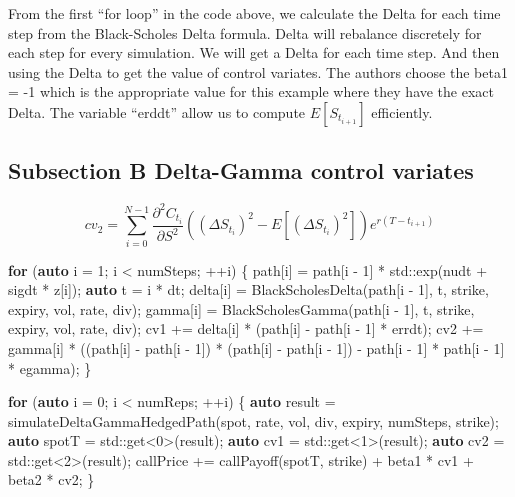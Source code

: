\documentclass[11pt,]{article}
\newenvironment{Shaded}{\begin{snugshade}}{\end{snugshade}}
\newcommand{\KeywordTok}[1]{\textcolor[rgb]{0.13,0.29,0.53}{\textbf{#1}}}
\newcommand{\DecValTok}[1]{\textcolor[rgb]{0.00,0.00,0.81}{#1}}
\newcommand{\ControlFlowTok}[1]{\textcolor[rgb]{0.13,0.29,0.53}{\textbf{#1}}}
\newcommand{\BuiltInTok}[1]{#1}
\newcommand{\NormalTok}[1]{#1}
\begin{document}
From the first ``for loop'' in the code above, we calculate the Delta
for each time step from the Black-Scholes Delta formula. Delta will
rebalance discretely for each step for every simulation. We will get a
Delta for each time step. And then using the Delta to get the value of
control variates. The authors choose the beta1 = -1 which is the
appropriate value for this example where they have the exact Delta. The
variable ``erddt'' allow us to compute \(E[S_{t_{i+1}}]\) efficiently.

\subsection{Subsection B Delta-Gamma control
variates}\label{subsection-b-delta-gamma-control-variates}

\[
cv_2 = \sum^{N-1}_{i=0} \frac{\partial^2 C_{t_i}}{\partial S^2}((\Delta S_{t_i})^2 - E[(\Delta S_{t_i})^2])e^{r(T-t_{i+1})}
\]

\begin{Shaded}
\begin{Highlighting}[]
\ControlFlowTok{for}\NormalTok{ (}\KeywordTok{auto}\NormalTok{ i = }\DecValTok{1}\NormalTok{; i < numSteps; ++i)}
\NormalTok{    \{}
\NormalTok{        path[i] = path[i - }\DecValTok{1}\NormalTok{] * }\BuiltInTok{std::}\NormalTok{exp(nudt + sigdt * z[i]);}
        \KeywordTok{auto}\NormalTok{ t = i * dt;}
\NormalTok{        delta[i] = BlackScholesDelta(path[i - }\DecValTok{1}\NormalTok{], t, strike, expiry, vol, rate, div);}
\NormalTok{        gamma[i] = BlackScholesGamma(path[i - }\DecValTok{1}\NormalTok{], t, strike, expiry, vol, rate, div);}
\NormalTok{        cv1 += delta[i] * (path[i] - path[i - }\DecValTok{1}\NormalTok{] * errdt);}
\NormalTok{        cv2 += gamma[i] * ((path[i] - path[i - }\DecValTok{1}\NormalTok{]) * (path[i] - path[i - }\DecValTok{1}\NormalTok{]) }
\NormalTok{                       - path[i - }\DecValTok{1}\NormalTok{] * path[i - }\DecValTok{1}\NormalTok{] * egamma);}
\NormalTok{    \}}

\ControlFlowTok{for}\NormalTok{ (}\KeywordTok{auto}\NormalTok{ i = }\DecValTok{0}\NormalTok{; i < numReps; ++i)}
\NormalTok{    \{}
        \KeywordTok{auto}\NormalTok{ result = simulateDeltaGammaHedgedPath(spot, rate, vol, div, expiry, numSteps, strike);}
        \KeywordTok{auto}\NormalTok{ spotT = }\BuiltInTok{std::}\NormalTok{get<}\DecValTok{0}\NormalTok{>(result);}
        \KeywordTok{auto}\NormalTok{ cv1 = }\BuiltInTok{std::}\NormalTok{get<}\DecValTok{1}\NormalTok{>(result);}
        \KeywordTok{auto}\NormalTok{ cv2 = }\BuiltInTok{std::}\NormalTok{get<}\DecValTok{2}\NormalTok{>(result);}
\NormalTok{        callPrice += callPayoff(spotT, strike) + beta1 * cv1 + beta2 * cv2;}
\NormalTok{    \}}
\end{Highlighting}
\end{Shaded}
\end{document}

